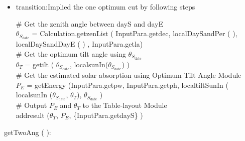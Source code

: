\documentclass[12pt, titlepage]{article}
\begin{document}
\begin{itemize}
\item transition:Implied the one optimum cut by following steps


$\#$ Get the zenith angle between dayS and
dayE\\
$\theta_{S_{\text{date}}}$ = Calculation.getzenList ( InputPara.getdec,   localDaySandPer ( ),  localDaySandDayE ( ) , InputPara.getla)\\

$\#$ Get the optimum tilt angle using $\theta_{S_{\text{date}}}$\\
$\theta_{T}$ = getilt ( $\theta_{S_{\text{date}}}$, localsunIn($\theta_{S_{\text{date}}}$) )\\


$\#$ Get the estimated solar absorption using Optimum Tilt Angle Module\\

$P_{E}$ = getEnergy (InputPara.getpw, InputPara.getph, localtiltSunIn ( localsunIn ($\theta_{S_{\text{date}}}$, $\theta_{T}$), $\theta_{S_{\text{date}}}$ )\\

$\#$ Output $P_{E}$ and $\theta_{T}$ to the Table-layout Module\\
addresult ($\theta_{T}$, $P_{E}$, \{InputPara.getdayS\} )\\



\end{itemize}

\noindent  getTwoAng ( ):
\end{document}
